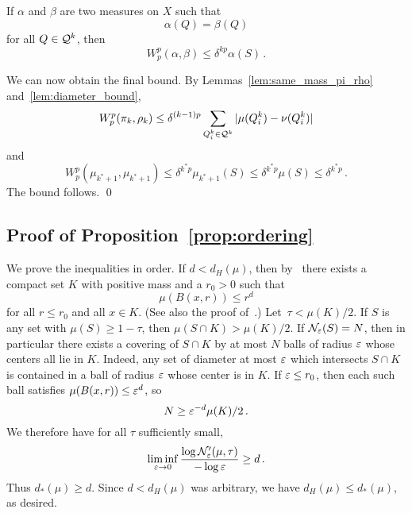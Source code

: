 
\begin{applemma}\label{lem:diameter_bound}
If $\alpha$ and $\beta$ are two measures on $X$ such that
\begin{equation*}
\alpha(Q) = \beta(Q)
\end{equation*}
for all $Q \in \mathcal{Q}^{k}$, then
\begin{equation*}
W_p^p(\alpha, \beta) \leq \delta^{kp} \alpha(S)\,.
\end{equation*}
\end{applemma}
We can now obtain the final bound.
By Lemmas~\ref{lem:same_mass_pi_rho} and~\ref{lem:diameter_bound},
\begin{equation*}
W_p^p(\pi_k, \rho_k) \leq \delta^{(k-1)p} \sum_{Q_i^k \in \mathcal{Q}^k} |\mu(Q_i^k) - \nu(Q_i^k)|
\end{equation*}
and
\begin{equation*}
W_p^p(\mu_{k^*+1}, \mu_{k^* + 1}) \leq \delta^{k^* p} \mu_{k^*+1}(S) \leq \delta^{k^* p} \mu(S) \leq \delta^{k^* p}\,.
\end{equation*}
The bound follows.
\qed

\subsection{Proof of Proposition~\ref{prop:ordering}}
We prove the inequalities in order.
If $d < d_H(\mu)$, then by~\cite[Proposition~10.3]{falconer1997techniques} there exists a compact set $K$ with positive mass and a $r_0 > 0$ such that
\begin{equation*}
\mu(B(x, r)) \leq r^d
\end{equation*}
for all $r \leq r_0$ and all $x \in K$.
(See also the proof of~\cite[Corollary~12.16]{GraLus07}.)
Let~$\tau < \mu(K)/2$.
If $S$ is any set with $\mu(S) \geq 1- \tau$, then $\mu(S \cap K) > \mu(K)/2$.
If $\mathcal{N}_\varepsilon(S) = N$, then in particular there exists a covering of $S \cap K$ by at most $N$ balls of radius $\varepsilon$ whose centers all lie in $K$.
Indeed, any set of diameter at most $\varepsilon$ which intersects $S \cap K$ is contained in a ball of radius $\varepsilon$ whose center is in $K$.
If $\varepsilon \leq r_0$, then each such ball satisfies $\mu(B(x, r)) \leq \varepsilon^d$, so
\begin{equation*}
N \geq \varepsilon^{-d} \mu(K)/2\,.
\end{equation*}
We therefore have for all $\tau$ sufficiently small,
\begin{equation*}
\liminf_{\varepsilon \to 0} \frac{\log \mathcal{N}_\varepsilon'(\mu, \tau)}{- \log \varepsilon} \geq d\,.
\end{equation*}
Thus $d_*(\mu) \geq d$.
Since $d < d_H(\mu)$ was arbitrary, we have $d_H(\mu) \leq d_*(\mu)$, as desired.

